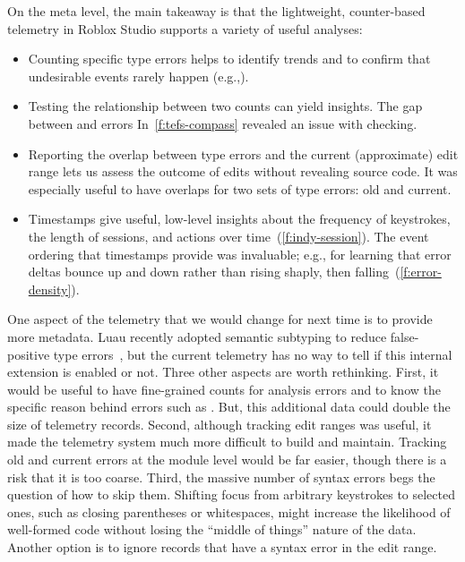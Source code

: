 \documentclass[english,submission,cleveref]{programming}
\begin{document}
On the meta level, the main takeaway is that the lightweight, counter-based telemetry
in Roblox Studio supports a variety of useful analyses:
\begin{itemize}
  \item
    Counting specific type errors helps to identify trends and to confirm that
    undesirable events rarely happen (e.g.,).
  \item
    Testing the relationship between two counts can yield insights.
    The gap between \mstrict{} and \FS{} errors In~\cref{f:tefs-compass}
    revealed an issue with \mstrict{} checking.
  \item
    Reporting the overlap between type errors and the current (approximate) edit
    range lets us assess the outcome of edits without revealing source code.
    It was especially useful to have overlaps for two sets of type errors: old and current.
  \item
    Timestamps give useful, low-level insights about the frequency of keystrokes,
    the length of sessions, and actions over time~(\cref{f:indy-session}).
    The event ordering that timestamps provide was invaluable; e.g., for learning
    that error deltas bounce up and down rather than rising shaply, then falling~(\cref{f:error-density}).
\end{itemize}

One aspect of the telemetry that we would change for next time is to provide
more metadata.
Luau recently adopted semantic subtyping to reduce false-positive type
errors~\cite{CF05:GentleIntroduction,Jef22:SemanticSubtyping}, but the current
telemetry has no way to tell if this
internal extension is enabled or not.
Three other aspects are worth rethinking.
First, it would be useful to have fine-grained counts for \FS{} analysis
errors and to know the specific reason behind errors such as .
But, this additional data could double the size of telemetry records.
Second, although tracking edit ranges was useful, it made the telemetry system
much more difficult to build and maintain.
Tracking old and current errors at the module level would be far easier,
though there is a risk that it is too coarse.
Third, the massive number of syntax errors begs the question of how to skip
them.
Shifting focus from arbitrary keystrokes to selected ones, such as closing
parentheses or whitespaces, might increase the likelihood of well-formed
code without losing the ``middle of things'' nature of the data.
Another option is to ignore records that have a syntax error in the edit range.
\end{document}
